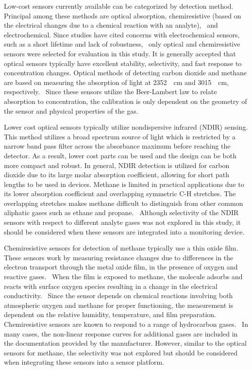 \documentclass[times]{joehreview}
\begin{document}
	Low-cost sensors currently available can be categorized by detection method.  Principal among these methods are optical absorption, chemiresistive (based on the electrical changes due to a chemical reaction with an analyte),~\cite{wetchakun_semiconducting_2011} and electrochemical.  Since studies have cited concerns with electrochemical sensors, such as a short lifetime and lack of robustness,~\cite{neri_first_2015} only optical and chemiresistive sensors were selected for evaluation in this study.  It is generally accepted that optical sensors typically have excellent stability, selectivity, and fast response to concentration changes.  Optical methods of detecting carbon dioxide and methane are based on measuring the absorption of light at \SI{2352}{\per\centi\meter} and \SI{3015}{\per\centi\meter}, respectively.~\cite{frodl_high-precision_2006,zhu_one_2012}  Since these sensors utilize the Beer-Lambert law to relate absorption to concentration, the calibration is only dependent on the geometry of the sensor and physical properties of the gas.~\cite{bacsik_ftir_2004}  
	
	Lower cost optical sensors typically utilize nondispersive infrared (NDIR) sensing.  This method utilizes a broad spectrum source of light which is restricted by a narrow band pass filter across the absorbance maximum before reaching the detector.  As a result, lower cost parts can be used and the design can be both more compact and robust.  In general, NDIR detection is utilized for carbon dioxide due to its large molar absorption coefficient, allowing for short path lengths to be used in devices.  Methane is limited in practical applications due to its lower absorption coefficient and overlapping symmetric C-H stretches.  The overlapping stretches makes methane difficult to distinguish from other common aliphatic gases such as ethane and propane.~\cite{coblentz_society_inc._evaluated_????}  Although selectivity of the NDIR sensors with respect to different analyte gases was not explored in this study, it should be considered when these sensors are integrated into a monitoring device. 
		
	Chemiresistive sensors for detection of methane typically use a thin oxide film.~\cite{neri_first_2015}  These sensors work by measuring resistance changes due to differences in the electron transport through the metal oxide film, in the presence of oxygen and reactive gases.~\cite{albert_cross-reactive_2000}  When the film is exposed to methane, the molecule adsorbs and reacts with surface oxygen species resulting in a change in the electrical conductivity.~\cite{wang_metal_2010,prudenziati_thick-film_1986}  Since the sensor depends on chemical reactions involving both atmospheric oxygen and methane for proper functioning, the measurement is dependent on the relative humidity, temperature, and film preparation.  Chemiresistive sensors are known to respond to a range of hydrocarbon gases.~\cite{sekhar_development_2016} In many cases, the non-linear response curves for additional gases are included in the documentation provided by the manufacturer.  However, similar to the optical sensors for methane, the selectivity was not explored but should be considered when integrating these sensors into a sensor platform.
	
\end{document}
